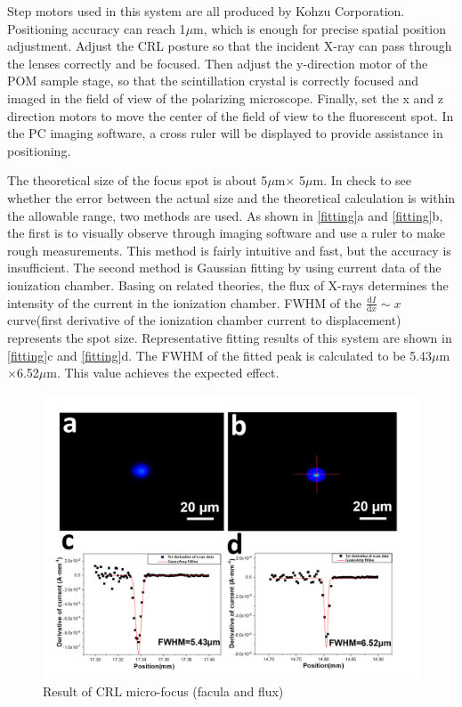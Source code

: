 \documentclass{Head}
\begin{document}
Step motors used in this system are all produced by Kohzu Corporation.
Positioning accuracy can reach 1$\mu$m, which is enough for precise spatial position adjustment.
Adjust the CRL posture so that the incident X-ray can pass through the lenses correctly and be focused.
Then adjust the y-direction motor of the POM sample stage, so that the scintillation crystal is correctly focused and imaged in the field of view of the polarizing microscope.
Finally, set the x and z direction motors to move the center of the field of view to the fluorescent spot.
In the PC imaging software, a cross ruler will be displayed to provide assistance in positioning.



The theoretical size of the focus spot is about 5$\mu$m$\times$ 5$\mu$m.
In check to see whether the error between the actual size and the theoretical calculation is within the allowable range, two methods are used.
As shown in \autoref{fitting}a and \autoref{fitting}b, the first is to visually observe through imaging software and use a ruler to make rough measurements.
This method is fairly intuitive and fast, but the accuracy is insufficient.
The second method is Gaussian fitting by using current data of the ionization chamber.
Basing on related theories, the flux of X-rays determines the intensity of the current in the ionization chamber.
FWHM of the $\frac{\mathrm{d}I}{\mathrm{d}x}\sim x$ curve(first derivative of the ionization chamber current to displacement) represents the spot size.
Representative fitting results of this system are shown in \autoref{fitting}c and \autoref{fitting}d.
The FWHM of the fitted peak is calculated to be 5.43$\mu$m$\times$6.52$\mu$m.
This value achieves the expected effect.
\begin{figure}
    \centering
    \includegraphics[scale=0.5]{Figures/Fig6CRLmicrofocus.png}
    \caption{Result of CRL micro-focus (facula and flux)}
    \label{fitting}
\end{figure}
\end{document}
